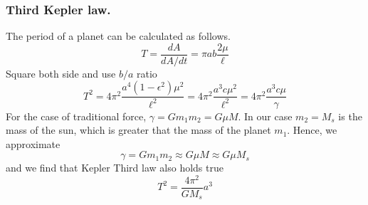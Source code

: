 \documentclass[../../../main.tex]{subfiles}
\begin{document}
\subsubsection{Third Kepler law.}
The period of a planet can be calculated as follows.
\begin{equation*}
    T=\frac{dA }{dA/dt}=\pi ab\frac{2\mu }{\ell}
\end{equation*}
Square both side and use $b/a$ ratio 
\begin{equation*}
    T^2=4\pi^2 \frac{a^4(1-\epsilon^2)\mu^2 }{\ell^2}
    =4\pi^2 \frac{a^3c\mu^2 }{\ell^2}
    =4\pi^2 \frac{a^3c\mu}{\gamma}
\end{equation*}
For the case of traditional force, $\gamma=Gm_1m_2=G\mu M$.
In our case $m_2=M_s$ is the mass of the sun, which is greater that the mass of the planet $m_1$.
Hence, we approximate 
\begin{equation*}
    \gamma=Gm_1m_2\approx G\mu M\approx G \mu M_s
\end{equation*}
and we find that Kepler Third law also holds true 
\begin{equation*}
    T^2=\frac{4\pi^2 }{GM_s }a^3
\end{equation*}
\end{document}
